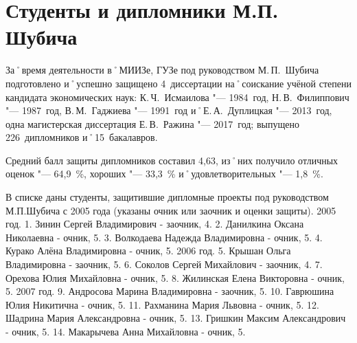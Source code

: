 ﻿\section{Студенты и дипломники М.П. Шубича}
За˚время деятельности в˚МИИЗе, ГУЗе под руководством М.\,П.~Шубича подготовлено и˚успешно защищено 4~диссертации на˚соискание учёной степени кандидата экономических наук: К.\,Ч.~Исмаилова "--- 1984~год, Н.\,В.~Филиппович "--- 1987~год, В.\,М.~Гаджиева "--- 1991~год и˚Е.\,А.~Дуплицкая "--- 2013~год, одна магистерская диссертация Е.\,В.~Ражина "--- 2017~год; выпущено 226~дипломников и˚15~бакалавров.

Средний балл защиты дипломников составил 4,63, из˚них получило отличных оценок "--- 64,9~\%, хороших "--- 33,3~\% и˚удовлетворительных "--- 1,8~\%.

В списке даны студенты, защитившие дипломные проекты под руководством М.П.Шубича с 2005 года (указаны очник или заочник и оценки защиты).
2005 год.
1. Зинин Сергей Владимирович - заочник, 4.
2. Данилкина Оксана Николаевна - очник, 5.
3. Волкодаева Надежда Владимировна - очник, 5.
4. Курако Алёна Владимировна - очник, 5.
2006 год.
5. Крышан Ольга Владимировна - заочник, 5.
6. Соколов Сергей Михайлович - заочник, 4.
7. Орехова Юлия Михайловна - очник, 5.
8. Жилинская Елена Викторовна - очник, 5.
2007 год.
9. Андросова Марина Владимировна - заочник, 5.
10. Гаврюшина Юлия Никитична - очник, 5.
11. Рахманина Мария Львовна - очник, 5.
12. Шадрина Мария Александровна - очник, 5.
13. Гришкин Максим Александрович - очник, 5. 
14. Макарычева Анна Михайловна - очник, 5.